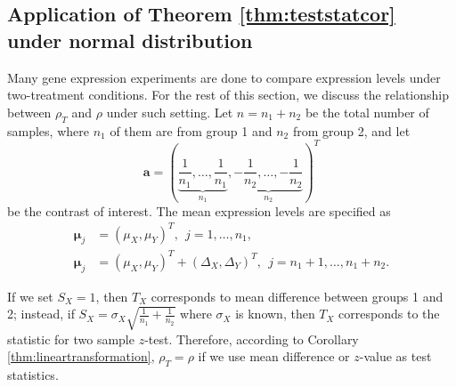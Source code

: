 \documentclass[12pt, a4paper]{article}
\begin{document}
	\subsection{Application of Theorem \ref{thm:teststatcor} under normal distribution}
	
	Many gene expression experiments are done to compare expression levels under two-treatment conditions. For the rest of this section, we discuss the relationship between $\rho_T$ and $\rho$ under such setting.
	Let $n = n_1 + n_2$ be the total number of samples, where $n_1$ of them are from group 1 and 
	$n_2$ from group 2, and let
	\begin{equation}\label{eq:contrast}
	\bm a  = (\underbrace{\frac{1}{n_1}, \ldots, \frac{1}{n_1}}_{n_1}, \underbrace{-\frac{1}{n_2}, \ldots, -\frac{1}{n_2}}_{n_2})^T
	\end{equation}
	be the contrast of interest. 
	 The mean expression levels are specified as 
	 \begin{equation}\label{eq:meanTwogroup}
	 \begin{aligned}
	 \bm \mu_j &= (\mu_X, \mu_Y)^T,~~ j = 1, \ldots, n_1, \\
	 \bm \mu_j &= (\mu_X,  \mu_Y)^T  + ( \Delta_X,\Delta_Y)^T, ~~j = n_1 + 1, \ldots, n_1 + n_2.
	 \end{aligned}
	 \end{equation}
	 
	 
	If we set $S_X=1$, then $T_X$ corresponds to mean difference between groups 1 and 2; instead, 
	if $S_X = \sigma_X\sqrt{\frac{1}{n_1} + \frac{1}{n_2}}$ where $\sigma_X$ is known, then $T_X$ 
	corresponds to the statistic for two sample $z$-test. Therefore, according to Corollary 
	\ref{thm:lineartransformation},  $\rho_T=\rho$ if we use mean difference or $z$-value as test 
	statistics.
	
\end{document}
